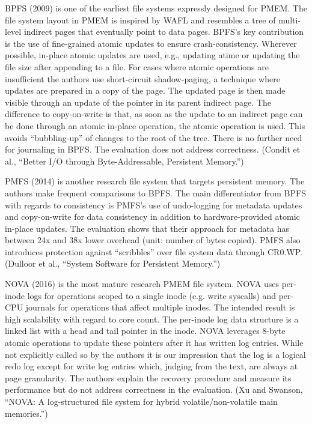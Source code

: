 \documentclass[12pt,a4paper,twoside,draft]{book}
\begin{document}
BPFS (2009) is one of the earliest file systems expressly designed for PMEM. The file system layout in PMEM is inspired by WAFL and resembles a tree of multi-level indirect pages that eventually point to data pages. BPFS’s key contribution is the use of fine-grained atomic updates to ensure crash-consistency.  Wherever possible, in-place atomic updates are used, e.g., updating atime or updating the file size after appending to a file. For cases where atomic operations are insufficient the authors use short-circuit shadow-paging, a technique where updates are prepared in a copy of the page. The updated page is then made visible through an update of the pointer in its parent indirect page. The difference to copy-on-write is that, as soon as the update to an indirect page can be done through an atomic in-place operation, the atomic operation is used. This avoids “bubbling-up” of changes to the root of the tree. There is no further need for journaling in BPFS. The evaluation does not address correctness. (Condit et al., “Better I/O through Byte-Addressable, Persistent Memory.”)

PMFS (2014) is another research file system that targets persistent memory. The authors make frequent comparisons to BPFS. The main differentiator from BPFS with regards to consistency is PMFS’s use of undo-logging for metadata updates and copy-on-write for data consistency in addition to hardware-provided atomic in-place updates. The evaluation shows that their approach for metadata has between 24x and 38x lower overhead (unit: number of bytes copied). PMFS also introduces protection against “scribbles” over file system data through CR0.WP. (Dulloor et al., “System Software for Persistent Memory.”)

NOVA (2016) is the most mature research PMEM file system. NOVA uses per-inode logs for operations scoped to a single inode (e.g. write syscalls) and per-CPU journals for operations that affect multiple inodes. The intended result is high scalability with regard to core count. The per-inode log data structure is a linked list with a head and tail pointer in the inode. NOVA leverages 8-byte atomic operations to update these pointers after it has written log entries. While not explicitly called so by the authors it is our impression that the log is a logical redo log except for write log entries which, judging from the text, are always at page granularity. The authors explain the recovery procedure and measure its performance but do not address correctness in the evaluation. (Xu and Swanson, “NOVA: A log-structured file system for hybrid volatile/non-volatile main memories.”)
\end{document}
